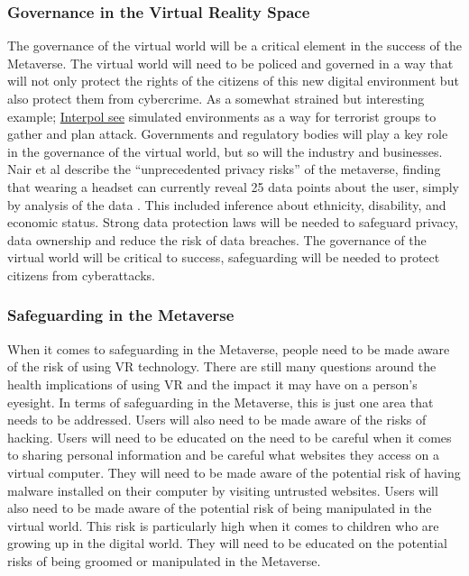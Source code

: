 \subsubsection{Governance in the Virtual Reality Space}
The governance of the virtual world will be a critical element in the success of the Metaverse. The virtual world will need to be policed and governed in a way that will not only protect the rights of the citizens of this new digital environment but also protect them from cybercrime. As a somewhat strained but interesting example; \href{https://www.reuters.com/technology/interpol-says-metaverse-opens-up-new-world-cybercrime-2022-10-27/}{Interpol see} simulated environments as a way for terrorist groups to gather and plan attack. Governments and regulatory bodies will play a key role in the governance of the virtual world, but so will the industry and businesses. Nair et al describe the ``unprecedented privacy risks'' of the metaverse, finding that wearing a headset can currently reveal 25 data points about the user, simply by analysis of the data \cite{nair2022exploring, Nair2023}.  This included inference about ethnicity, disability, and economic status. Strong data protection laws will be needed to safeguard privacy, data ownership and reduce the risk of data breaches. The governance of the virtual world will be critical to success, safeguarding will be needed to protect citizens from cyberattacks.
\subsubsection{Safeguarding in the Metaverse}
When it comes to safeguarding in the Metaverse, people need to be made aware of the risk of using VR technology. There are still many questions around the health implications of using VR and the impact it may have on a person’s eyesight. In terms of safeguarding in the Metaverse, this is just one area that needs to be addressed. Users will also need to be made aware of the risks of hacking. Users will need to be educated on the need to be careful when it comes to sharing personal information and be careful what websites they access on a virtual computer. They will need to be made aware of the potential risk of having malware installed on their computer by visiting untrusted websites. Users will also need to be made aware of the potential risk of being manipulated in the virtual world. This risk is particularly high when it comes to children who are growing up in the digital world. They will need to be educated on the potential risks of being groomed or manipulated in the Metaverse.\\

